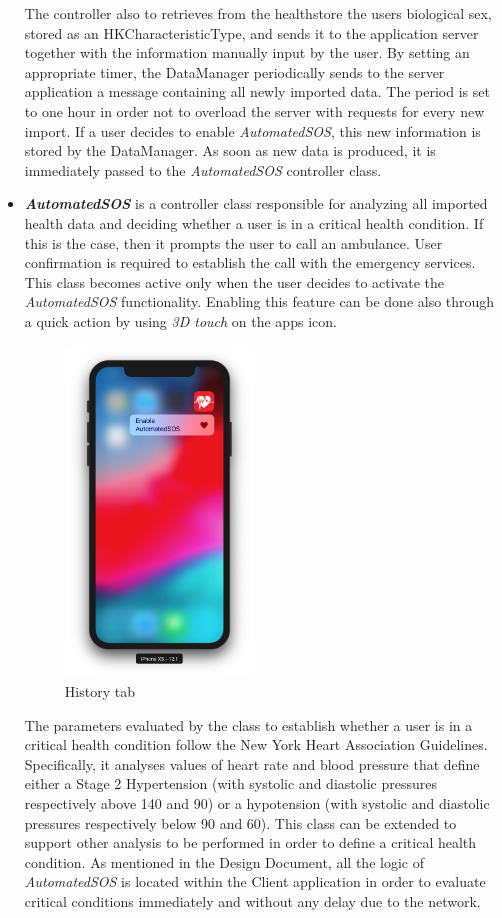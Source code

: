 \documentclass[titlepage]{article}
\begin{document}
\begin{itemize}
		The controller also to retrieves from the healthstore the user\textsc{}s biological sex, stored as an HKCharacteristicType, and sends it to the application server together with the information manually input by the user.
		By setting an appropriate timer, the DataManager periodically sends to the server application a message containing all newly imported data. The period is set to one hour in order not to overload the server with requests for every new import.
		If a user decides to enable {\it AutomatedSOS}, this new information is stored by the DataManager. As soon as new data is produced, it is immediately passed to the {\it AutomatedSOS} controller class.
		\item {\bf {\it AutomatedSOS}} is a controller class responsible for analyzing all imported health data and deciding whether a user is in a critical health condition. If this is the case, then it prompts the user to call an ambulance. User confirmation is required to establish the call with the emergency services. 
		This class becomes active only when the user decides to activate the {\it AutomatedSOS} functionality. Enabling this feature can be done also through a quick action by using {\it 3D touch} on the app\textsc{}s icon.
		
		\begin{figure}[H]
			\center
			\includegraphics[width=5cm]{SimulatorScreenshots/3DTouch.png}
			\caption{History tab}
			\label{fig:Hist}
		\end{figure}
		
		The parameters evaluated by the class to establish whether a user is in a critical health condition follow the New York Heart Association Guidelines. Specifically, it analyses values of heart rate and blood pressure that define either a Stage 2 Hypertension (with systolic and diastolic pressures respectively above 140 and 90) or a hypotension (with systolic and diastolic pressures respectively below 90 and 60).
		This class can be extended to support other analysis to be performed in order to define a critical health condition.
		As mentioned in the Design Document, all the logic of {\it AutomatedSOS} is located within the Client application in order to evaluate critical conditions immediately and without any delay due to the network.
	\end{itemize}
	
\end{document}

